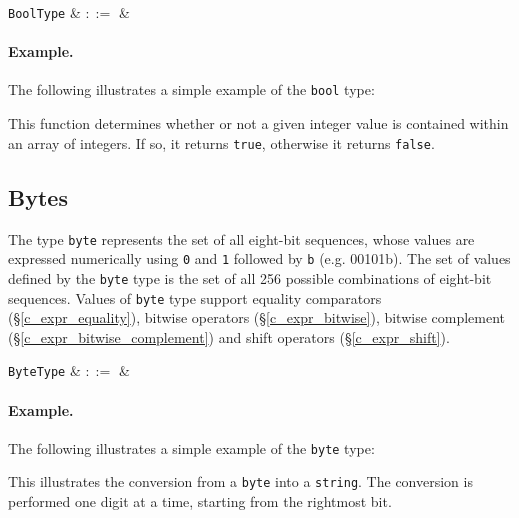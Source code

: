 \begin{syntax}
 \verb+BoolType+ & $::=$ &  \\
\end{syntax}

\paragraph{Example.} The following illustrates a simple example of the \lstinline{bool} type:



This function determines whether or not a given integer value is contained within an array of integers.  If so, it returns \lstinline{true}, otherwise it returns \lstinline{false}.


\subsection{Bytes}
\label{c_types_byte}

The type \lstinline{byte} represents the set of all eight-bit sequences, whose values are expressed numerically using \lstinline{0} and \lstinline{1} followed by \lstinline{b} (e.g. 00101b).  The set of values defined by the \lstinline{byte} type is the set of all 256 possible combinations of eight-bit sequences.   Values of \lstinline{byte} type support equality comparators (\S\ref{c_expr_equality}), bitwise operators (\S\ref{c_expr_bitwise}), bitwise complement (\S\ref{c_expr_bitwise_complement}) and shift operators (\S\ref{c_expr_shift}).

\begin{syntax}
 \verb+ByteType+ & $::=$ & \\
\end{syntax}

\paragraph{Example.} The following illustrates a simple example of the \lstinline{byte} type:



This illustrates the conversion from a \lstinline{byte} into a \lstinline{string}.  The conversion is performed one digit at a time, starting from the rightmost bit.

